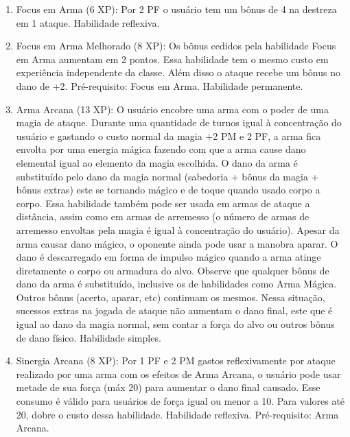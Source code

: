  
\begin{enumerate}

	\item Focus em Arma (6 XP): Por 2 PF o usuário tem um bônus de 4 na destreza em 1 ataque. Habilidade reflexiva.

	\item Focus em Arma Melhorado (8 XP): Os bônus cedidos pela habilidade Focus em Arma aumentam em 2 pontos. Essa habilidade tem o mesmo custo em experiência independente da classe. Além disso o ataque recebe um bônus no dano de +2. Pré-requisito: Focus em Arma. Habilidade permanente.

     
  \item Arma Arcana (13 XP): O usuário encobre uma arma com o poder de uma magia de ataque. Durante uma quantidade de turnos igual à concentração do usuário e gastando o custo normal da magia +2 PM e 2 PF, a arma fica envolta por uma energia mágica fazendo com que a arma cause dano elemental igual ao elemento da magia escolhida. O dano da arma é substituído pelo dano da magia normal (sabedoria + bônus da magia + bônus extras) este se tornando mágico e de toque quando usado corpo a corpo. Essa habilidade também pode ser usada em armas de ataque a distância, assim como em armas de arremesso (o número de armas de arremesso envoltas pela magia é igual à concentração do usuário). Apesar da arma causar dano mágico, o oponente ainda pode usar a manobra aparar. O dano é descarregado em forma de impulso mágico quando a arma atinge diretamente o corpo ou armadura do alvo. Observe que qualquer bônus de dano da arma é substituído, inclusive os de habilidades como Arma Mágica. Outros bônus (acerto, aparar, etc) continuam os mesmos. Nessa situação, sucessos extras na jogada de ataque não aumentam o dano final, este que é igual ao dano da magia normal, sem contar a força do alvo ou outros bônus de dano físico. Habilidade simples. 
  
  \item Sinergia Arcana (8 XP): Por 1 PF e 2 PM gastos reflexivamente por ataque realizado por uma arma com os efeitos de Arma Arcana, o usuário pode usar metade de sua força (máx 20) para aumentar o dano final causado. Esse consumo é válido para usuários de força igual ou menor a 10. Para valores até 20, dobre o custo dessa habilidade. Habilidade reflexiva. Pré-requisito: Arma Arcana. 
  

\end{enumerate}
